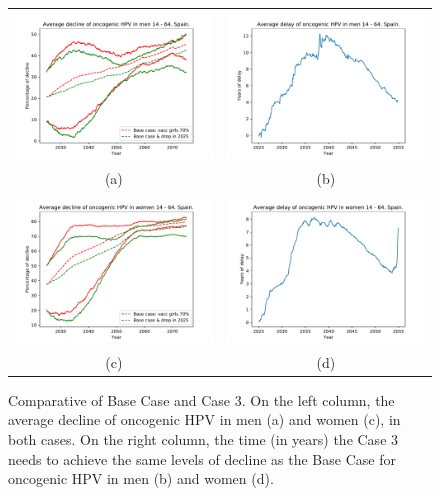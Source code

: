 \begin{figure}[!]
	\centering
	\begin{tabular}{cc}
		\includegraphics[width=0.5\linewidth]{IMGs/11.-Resilencia/Base_y_3/decline_onco_hom.pdf}	& 
		\includegraphics[width=0.5\linewidth]{IMGs/11.-Resilencia/Base_y_3/resilencia_onco_hom.pdf}  \\ 
		(a)	& (b) \\ 
		\includegraphics[width=0.5\linewidth]{IMGs/11.-Resilencia/Base_y_3/decline_onco_muj.pdf}	& 
		\includegraphics[width=0.5\linewidth]{IMGs/11.-Resilencia/Base_y_3/resilencia_onco_muj.pdf}  \\ 
		(c)	& (d) \\
	\end{tabular} 
	\caption{Comparative of Base Case and Case 3. On the left column, the average decline of oncogenic HPV in men (a) and women (c), in both cases. On the right column, the time (in years) the Case 3 needs to achieve the same levels of decline as the Base Case for oncogenic HPV in men (b) and women (d).}
	\label{fig:baseCase_Case3}
\end{figure}

